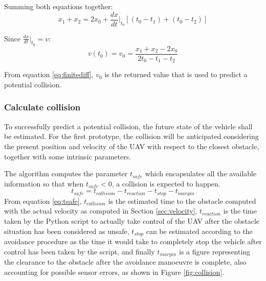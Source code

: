 Summing both equations together:
\begin{equation}
	x_1+x_2=2x_0+\frac{dx}{dt}\Bigg\rvert_{t_0}
		\left[\left(t_0-t_1\right)+\left(t_0-t_2\right)\right]
	\label{eq:finite}
\end{equation}

Since $\frac{dx}{dt}\big\rvert_{t_0}=v$:
\begin{equation}
	v\left(t_0\right)=v_0=\frac{x_1+x_2-2x_0}{2t_0-t_1-t_2}
	\label{eq:finitediff}
\end{equation}

From equation \eqref{eq:finitediff}, $v_0$ is the returned value that is used to predict a potential collision.

\subsubsection{Calculate collision}

To successfully predict a potential collision, the future state of the vehicle shall be estimated.
For the first prototype, the collision will be anticipated considering the present position and velocity of the UAV with respect to the closest obstacle, together with some intrinsic parameters.

The algorithm computes the parameter $t_{safe}$ which encapsulates all the available information so that when $t_{safe}<0$, a collision is expected to happen.
\begin{equation}
	t_{safe}=t_{collision}-t_{reaction}-t_{stop}-t_{margin}
	\label{eq:tsafe}
\end{equation}
From equation \eqref{eq:tsafe}, $t_{collision}$ is the estimated time to the obstacle computed with the actual velocity as computed in Section \ref{sec:velocity}, $t_{reaction}$ is the time taken by the Python script to actually take control of the UAV after the obstacle situation has been considered as unsafe, $t_{stop}$ can be estimated according to the avoidance procedure as the time it would take to completely stop the vehicle after control has been taken by the script, and finally $t_{margin}$ is a figure representing the clearance to the obstacle after the avoidance manoeuvre is complete, also accounting for possible sensor errors, as shown in Figure \ref{fig:collision}.




